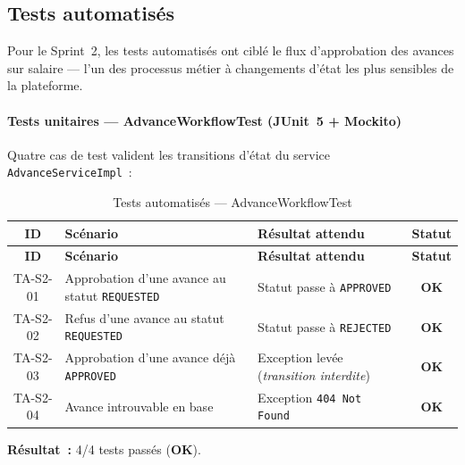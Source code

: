 \subsection{Tests automatisés}

Pour le Sprint~2, les tests automatisés ont ciblé le flux d'approbation
des avances sur salaire --- l'un des processus métier à changements d'état
les plus sensibles de la plateforme.

\paragraph{Tests unitaires --- AdvanceWorkflowTest (JUnit~5 + Mockito)}
Quatre cas de test valident les transitions d'état du service \texttt{AdvanceServiceImpl}~:

\renewcommand{\arraystretch}{1.2}
\begin{small}
\begin{xltabular}{\textwidth}{|c|X|p{4cm}|c|}
\hline
{}
\textbf{ID} & \textbf{Scénario} & \textbf{Résultat attendu} & \textbf{Statut} \\ \hline
\endfirsthead \hline
{}
\textbf{ID} & \textbf{Scénario} & \textbf{Résultat attendu} & \textbf{Statut} \\ \hline
\endhead \hline \endfoot \hline
\caption{Tests automatisés --- AdvanceWorkflowTest}\label{tab:auto-s2}\endlastfoot
TA-S2-01 & Approbation d'une avance au statut \texttt{REQUESTED}
    & Statut passe à \texttt{APPROVED} & \textcolor{green!60!black}{\textbf{OK}} \\ \hline
TA-S2-02 & Refus d'une avance au statut \texttt{REQUESTED}
    & Statut passe à \texttt{REJECTED} & \textcolor{green!60!black}{\textbf{OK}} \\ \hline
TA-S2-03 & Approbation d'une avance déjà \texttt{APPROVED}
    & Exception levée (\textit{transition interdite}) & \textcolor{green!60!black}{\textbf{OK}} \\ \hline
TA-S2-04 & Avance introuvable en base
    & Exception \texttt{404 Not Found} & \textcolor{green!60!black}{\textbf{OK}} \\ \hline
\end{xltabular}
\end{small}
\renewcommand{\arraystretch}{1.0}

\textbf{Résultat~:} 4/4 tests passés (\textcolor{green!60!black}{\textbf{OK}}).

